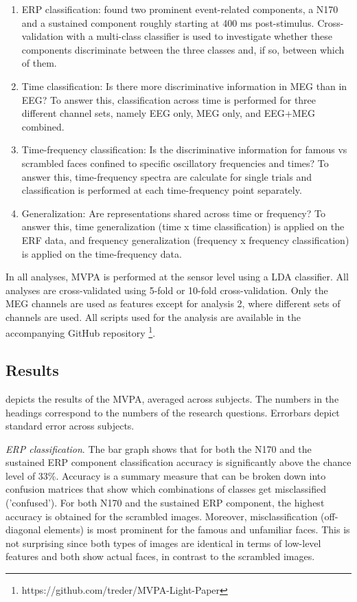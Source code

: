 \documentclass[utf8]{frontiersSCNS} %
\begin{document}
\begin{enumerate}
    \item ERP classification: \cite{Wakeman2015ADataset} found two prominent event-related components, a N170 and a sustained component roughly starting at 400 ms post-stimulus. Cross-validation with a multi-class classifier is used to investigate whether these components discriminate between the three classes and, if so, between which of them.
    \item Time classification: Is there more discriminative information in MEG than in EEG? To answer this, classification across time is performed for three different channel sets, namely EEG only, MEG only, and EEG+MEG combined. 
    \item Time-frequency classification: Is the discriminative information for famous vs scrambled faces confined to specific oscillatory frequencies and times? To answer this, time-frequency spectra are calculate for single trials and classification is performed at each time-frequency point separately. 
    \item Generalization: Are representations shared across time \citep{King2014} or frequency? To answer this, time generalization (time x time classification) is applied on the ERF data, and frequency generalization (frequency x frequency classification) is applied on the time-frequency data.
\end{enumerate}

In all analyses, MVPA is performed at the sensor level using a LDA classifier. All analyses are cross-validated using 5-fold or 10-fold cross-validation. Only the MEG channels are used as features except for analysis 2, where different sets of channels are used. All scripts used for the analysis are available in the accompanying GitHub repository \footnote{https://github.com/treder/MVPA-Light-Paper}.

\subsection{Results}

 depicts the results of the MVPA, averaged across subjects. The numbers in the headings correspond to the numbers of the research questions. Errorbars depict standard error across subjects.

\textit{ERP classification}. The bar graph shows that for both the N170 and the sustained ERP component classification accuracy is significantly above the chance level of 33\%. Accuracy is a summary measure that can be broken down into confusion matrices that show which combinations of classes get misclassified ('confused'). For both N170 and the sustained ERP component, the highest accuracy is obtained for the scrambled images. Moreover,  misclassification (off-diagonal elements) is most prominent for the famous and unfamiliar faces. This is not surprising since both types of images are identical in terms of low-level features and both show actual faces, in contrast to the scrambled images. 
\end{document}
